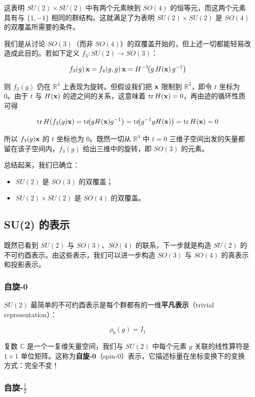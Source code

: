 这表明 $SU(2)\times SU(2)$ 中有两个元素映到 $SO(4)$ 的恒等元，而这两个元素具有与 $\{1,-1\}$ 相同的群结构。这就满足了为表明 $SU(2)\times SU(2)$ 是 $SO(4)$ 的双覆盖所需要的条件。

我们是从讨论 $SO(3)$（而非 $SO(4)$）的双覆盖开始的，但上述一切都能轻易改造成此目的。若如下定义 $f_{3}:SU(2)\to SO(3)$：

\[
f_{3}(g)\,\mathbf{x}=f_{4}(g,g)\,\mathbf{x}=H^{-1}\!\bigl(g\,H(\mathbf{x})\,g^{-1}\bigr)
\]

则 $f_{3}(g)$ 仍在 $\mathbb{R}^{4}$ 上表现为旋转。但假设我们把 $\mathbf{x}$ 限制到 $\mathbb{R}^{3}$，即令 $t$ 坐标为 0。由于 $t$ 与 $H(\mathbf{x})$ 的迹之间的关系，这意味着 $\operatorname{tr} H(\mathbf{x})=0$，再由迹的循环性质可得

\[
\operatorname{tr} H(f_{3}(g)\mathbf{x})=\operatorname{tr}\!\bigl(gH(\mathbf{x})g^{-1}\bigr)=\operatorname{tr}\!\bigl(g^{-1}gH(\mathbf{x})\bigr)=\operatorname{tr} H(\mathbf{x})=0
\]

所以 $f_{3}(g)\mathbf{x}$ 的 $t$ 坐标也为 0。既然一切从 $\mathbb{R}^{4}$ 中 $t=0$ 三维子空间出发的矢量都留在该子空间内，$f_{3}(g)$ 给出三维中的旋转，即 $SO(3)$ 的元素。

总结起来，我们已确立：

\begin{itemize}
  \item $SU(2)$ 是 $SO(3)$ 的双覆盖；
  \item $SU(2)\times SU(2)$ 是 $SO(4)$ 的双覆盖。
\end{itemize}

\subsection{SU(2) 的表示}

既然已看到 $SU(2)$ 与 $SO(3)$、$SO(4)$ 的联系，下一步就是构造 $SU(2)$ 的不可约酉表示。由这些表示，我们可以进一步构造 $SO(3)$ 与 $SO(4)$ 的真表示和投影表示。

\subsubsection{自旋-0}

$SU(2)$ 最简单的不可约酉表示是每个群都有的一维\textbf{平凡表示}（trivial representation）：

\[
\rho_{0}(g)=I_{1}
\]

复数 $\mathbb{C}$ 是一个一复维矢量空间，我们与 $SU(2)$ 中每个元素 $g$ 关联的线性算符是 $1\times1$ 单位矩阵。这称为\textbf{自旋-0}（spin-0）表示，它描述标量在坐标变换下的变换方式：完全不变！

\subsubsection{自旋-$\tfrac12$}

